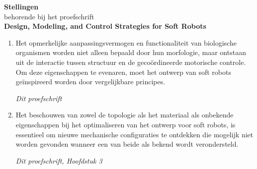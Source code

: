 \documentclass[a5paper]{article}
\renewcommand{\normalsize}{\fontsize{9}{9}\selectfont}
\newcommand{\largesize}{\fontsize{10}{9}\selectfont}
\begin{document}
\clearpage

\begin{center}
\largesize \textbf{Stellingen} \\[0.45em]
\normalsize behorende bij het proefschrift \\[0.45em]
{\textbf{\largesize Design, Modeling, and Control Strategies for Soft Robots}}
\end{center}

\begin{enumerate}
\setlength\itemsep{0.23em}
\item Het opmerkelijke aanpassingsvermogen en functionaliteit van biologische organismen worden niet alleen bepaald door hun morfologie, maar ontstaan uit de interactie tussen structuur en de gecoördineerde motorische controle. Om deze eigenschappen te evenaren, moet het ontwerp van soft robots geïnspireerd worden door vergelijkbare principes.
\begin{flushright}
  \vspace{-2mm}
  \textit{Dit proefschrift}
  \vspace{-1mm}
  \end{flushright}

\item Het beschouwen van zowel de topologie als het materiaal als onbekende eigenschappen bij het optimaliseren van het ontwerp voor soft robots, is essentieel om nieuwe mechanische configuraties te ontdekken die mogelijk niet worden gevonden wanneer een van beide als bekend wordt verondersteld.
\begin{flushright}
  \vspace{-5mm}
  \textit{Dit proefschrift, Hoofdstuk 3}
  \vspace{-1mm}
  \end{flushright}




\end{enumerate}
\end{document}

